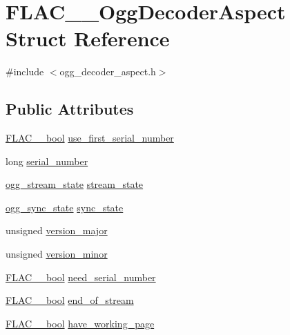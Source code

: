 \hypertarget{struct_f_l_a_c_____ogg_decoder_aspect}{}\section{F\+L\+A\+C\+\_\+\+\_\+\+Ogg\+Decoder\+Aspect Struct Reference}
\label{struct_f_l_a_c_____ogg_decoder_aspect}


{\ttfamily \#include $<$ogg\+\_\+decoder\+\_\+aspect.\+h$>$}

\subsection*{Public Attributes}
\begin{DoxyCompactItemize}
\item 
\hyperlink{ordinals_8h_a95103469f1cbd78b8cf250194985b34e}{F\+L\+A\+C\+\_\+\+\_\+bool} \hyperlink{struct_f_l_a_c_____ogg_decoder_aspect_a02f8d84efea668ff0e8fb692283a954b}{use\+\_\+first\+\_\+serial\+\_\+number}
\item 
long \hyperlink{struct_f_l_a_c_____ogg_decoder_aspect_a085a62e120d2adeb364251bf4a2787ac}{serial\+\_\+number}
\item 
\hyperlink{structogg__stream__state}{ogg\+\_\+stream\+\_\+state} \hyperlink{struct_f_l_a_c_____ogg_decoder_aspect_aeb15a03099d9b0395313c7b80ac56252}{stream\+\_\+state}
\item 
\hyperlink{structogg__sync__state}{ogg\+\_\+sync\+\_\+state} \hyperlink{struct_f_l_a_c_____ogg_decoder_aspect_af182109617349e8ba41fa975c7d234d1}{sync\+\_\+state}
\item 
unsigned \hyperlink{struct_f_l_a_c_____ogg_decoder_aspect_ae8f1e533b602dbc6ebe5c1c6be63c901}{version\+\_\+major}
\item 
unsigned \hyperlink{struct_f_l_a_c_____ogg_decoder_aspect_a69fcaf27fd0fc159ad6bf62c8ab3633e}{version\+\_\+minor}
\item 
\hyperlink{ordinals_8h_a95103469f1cbd78b8cf250194985b34e}{F\+L\+A\+C\+\_\+\+\_\+bool} \hyperlink{struct_f_l_a_c_____ogg_decoder_aspect_a16b14ef02b6674a7052f686bbca6999b}{need\+\_\+serial\+\_\+number}
\item 
\hyperlink{ordinals_8h_a95103469f1cbd78b8cf250194985b34e}{F\+L\+A\+C\+\_\+\+\_\+bool} \hyperlink{struct_f_l_a_c_____ogg_decoder_aspect_ab36b114f42b83331b5149cc2eb2148af}{end\+\_\+of\+\_\+stream}
\item 
\hyperlink{ordinals_8h_a95103469f1cbd78b8cf250194985b34e}{F\+L\+A\+C\+\_\+\+\_\+bool} \hyperlink{struct_f_l_a_c_____ogg_decoder_aspect_a189d26c093d2f4d55e1a00106d8c28ae}{have\+\_\+working\+\_\+page}

\end{DoxyCompactItemize}
